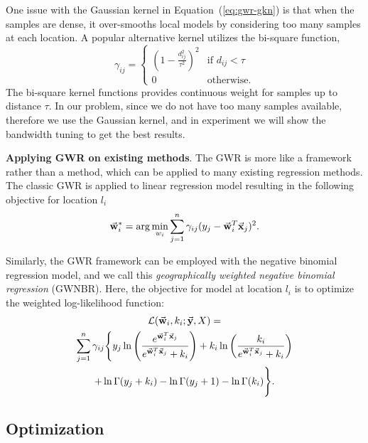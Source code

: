One issue with the Gaussian kernel in Equation~(\ref{eq:gwr-gkn}) is that when the samples are dense, it over-smooths local models by considering too many samples at each location. A popular alternative kernel utilizes the bi-square function,
\begin{equation}
\gamma_{ij} = \left\{ \begin{array}{ll}  \left( 1 - \frac{d_{ij}^2}{\tau^2}\right)^2 & \text{if $d_{ij} < \tau$} \\  0 & \text{otherwise.} \end{array} \right.
\end{equation}
The bi-square kernel functions provides continuous weight for samples up to distance $\tau$. In our problem, since we do not have too many samples available, therefore we use the Gaussian kernel, and in experiment we will show the bandwidth tuning to get the best results.


\textbf{Applying GWR on existing methods}. The GWR is more like a framework rather than a method, which can be applied to many existing regression methods. The classic GWR is applied to linear regression model resulting in the following objective for location $l_i$  
\begin{equation}
\vec{\mathbf{w}}_i^* = \arg\min_{w_i} \sum_{j=1}^n \gamma_{ij} (y_j - \vec{\mathbf{w}}_i^T \vec{\mathbf{x}}_j)^2.
\end{equation}


Similarly, the GWR framework can be employed with the negative binomial regression model, and we call this \emph{geographically weighted negative binomial regression} (GWNBR). Here, the objective for model at location $l_i$ is to optimize the weighted log-likelihood function:
\begin{multline}
\label{eq:finalObj}
\mathcal{L}(\vec{\mathbf{w}}_i, k_i; \vec{\mathbf{y}}, X) = \\
	\sum_{j=1}^n \gamma_{ij} \Bigg\{y_j \ln\left( \frac{e^{\vec{\mathbf{w}}_i^T \vec{\mathbf{x}}_j}}{e^{\vec{\mathbf{w}}_i^T \vec{\mathbf{x}}_j} + k_i}\right) + k_i \ln\left(\frac{k_i}{e^{\vec{\mathbf{w}}_i^T \vec{\mathbf{x}}_j} +k_i}\right) \\
	+ \ln \Gamma(y_j + k_i ) - \ln \Gamma(y_j + 1) - \ln \Gamma( k_i) \Bigg\}.
\end{multline}


\subsection{Optimization}

